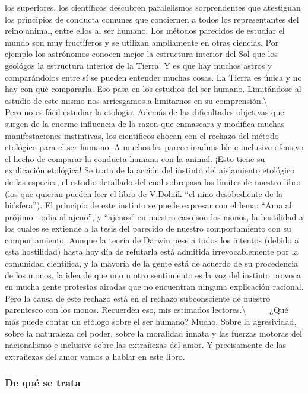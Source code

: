 los superiores, los científicos descubren paralelismos sorprendentes que
atestiguan los principios de conducta comunes que conciernen a todos los
representantes del reino animal, entre ellos al ser humano. Los métodos
parecidos de estudiar el mundo son muy fructíferos y se utilizan
ampliamente en otras ciencias. Por ejemplo los astrónomos conocen mejor
la estructura interior del Sol que los geológos la estructura interior
de la Tierra. Y es que hay muchos astros y comparándolos entre sí se
pueden entender muchas cosas. La Tierra es única y no hay con qué
compararla. Eso pasa en los estudios del ser humano. Limitándose al
estudio de este mismo nos arriesgamos a limitarnos en su
comprensión.\textbackslash{} ~ ~ ~ Pero no es fácil estudiar la
etologia. Además de las dificultades objetivas que surgen de la enorme
influencia de la razon que enmascara y modifica muchas manifestaciones
instintivas, los científicos chocan con el rechazo del método etológico
para el ser humano. A muchos les parece inadmisible e inclusive ofensivo
el hecho de comparar la conducta humana con la animal. ¡Esto tiene su
explicación etológica! Se trata de la acción del instinto del
aislamiento etológico de las especies, el estudio detallado del cual
sobrepasa los límites de nuestro libro (los que quieran pueden leer el
libro de V.Dolnik ``el nino desobediente de la biósfera''). El principio
de este instinto se puede expresar con el lema: ``Ama al prójimo - odia
al ajeno'', y ``ajenos'' en nuestro caso son los monos, la hostilidad a
los cuales se extiende a la tesis del parecido de nuestro comportamiento
con su comportamiento. Aunque la teoría de Darwin pese a todos los
intentos (debido a esta hostilidad) hasta hoy día de refutarla está
admitida irrevocablemente por la comunidad científica, y la mayoría de
la gente está de acuerdo de su procedencia de los monos, la idea de que
uno u otro sentimiento es la voz del instinto provoca en mucha gente
protestas airadas que no encuentran ninguna explicación racional. Pero
la causa de este rechazo está en el rechazo subconsciente de nuestro
parentesco con los monos. Recuerden eso, mis estimados
lectores.\textbackslash{} ~ ~ ~ ¿Qué más puede contar un etólogo sobre
el ser humano? Mucho. Sobre la agresividad, sobre la naturaleza del
poder, sobre la moralidad innata y las fuerzas motoras del nacionalismo
e inclusive sobre las extrañezas del amor. Y precisamente de las
extrañezas del amor vamos a hablar en este libro.

\protect\hypertarget{M1}{}{}

\subsubsection{De qué se trata}\label{de-quuxe9-se-trata}

